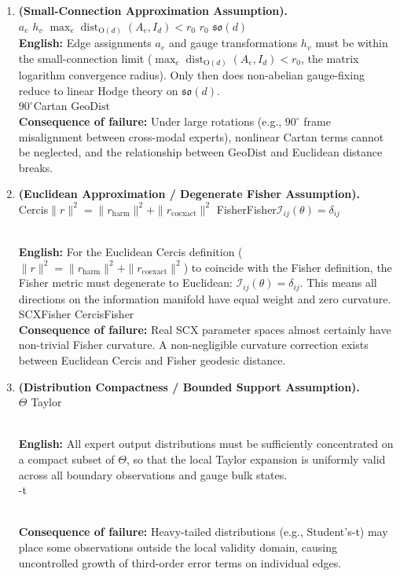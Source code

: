 \documentclass{article}
\newcommand{\GeoDist}{\mathrm{GeoDist}}
\newcommand{\Fisher}{\mathcal{I}}
\newcommand{\Od}{\mathrm{O}(d)}
\DeclareMathOperator{\dist}{dist}
\begin{document}
\begin{enumerate}[label=\textbf{H\arabic*:}, leftmargin=*, itemsep=0.8em]
    \item \textbf{ (Small-Connection Approximation Assumption).} \\
    \textbf{}  $a_e$  $h_v$ 
    $\max_e \dist_{\Od}(A_e, I_d) < r_0$ $r_0$ 
     $\mathfrak{so}(d)$ 
    \\[0.3em]
    \textbf{English:} Edge assignments $a_e$ and gauge transformations $h_v$ must be within the
    small-connection limit ($\max_e \dist_{\Od}(A_e, I_d) < r_0$, the matrix logarithm convergence radius).
    Only then does non-abelian gauge-fixing reduce to linear Hodge theory on $\mathfrak{so}(d)$.
    \\[0.3em]
    \textbf{} $90^\circ$Cartan
    $\GeoDist$ 
    \\[0.3em]
    \textbf{Consequence of failure:} Under large rotations (e.g., $90^\circ$ frame misalignment
    between cross-modal experts), nonlinear Cartan terms cannot be neglected, and the relationship
    between $\GeoDist$ and Euclidean distance breaks.

    \item \textbf{ (Euclidean Approximation / Degenerate Fisher Assumption).} \\
    \textbf{} Cercis$\|r\|^2 = \|r_{\text{harm}}\|^2 + \|r_{\text{coexact}}\|^2$
    FisherFisher$\Fisher_{ij}(\theta) = \delta_{ij}$
    
    \\[0.3em]
    \textbf{English:} For the Euclidean Cercis definition ($\|r\|^2 = \|r_{\text{harm}}\|^2 + \|r_{\text{coexact}}\|^2$)
    to coincide with the Fisher definition, the Fisher metric must degenerate to Euclidean:
    $\Fisher_{ij}(\theta) = \delta_{ij}$. This means all directions on the information manifold
    have equal weight and zero curvature.
    \\[0.3em]
    \textbf{} SCXFisher
    CercisFisher
    \\[0.3em]
    \textbf{Consequence of failure:} Real SCX parameter spaces almost certainly have non-trivial
    Fisher curvature. A non-negligible curvature correction exists between Euclidean Cercis and
    Fisher geodesic distance.

    \item \textbf{ (Distribution Compactness / Bounded Support Assumption).} \\
    \textbf{}  $\Theta$ Taylor
    
    \\[0.3em]
    \textbf{English:} All expert output distributions must be sufficiently concentrated on a compact
    subset of $\Theta$, so that the local Taylor expansion is uniformly valid across all
    boundary observations and gauge bulk states.
    \\[0.3em]
    \textbf{} -t
    
    \\[0.3em]
    \textbf{Consequence of failure:} Heavy-tailed distributions (e.g., Student's-t) may place
    some observations outside the local validity domain, causing uncontrolled growth of
    third-order error terms on individual edges.
\end{enumerate}
\end{document}

